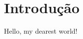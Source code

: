 \documentclass{article}
\begin{document}
\section{Introdução}
Hello, my dearest world!
\end{document}
